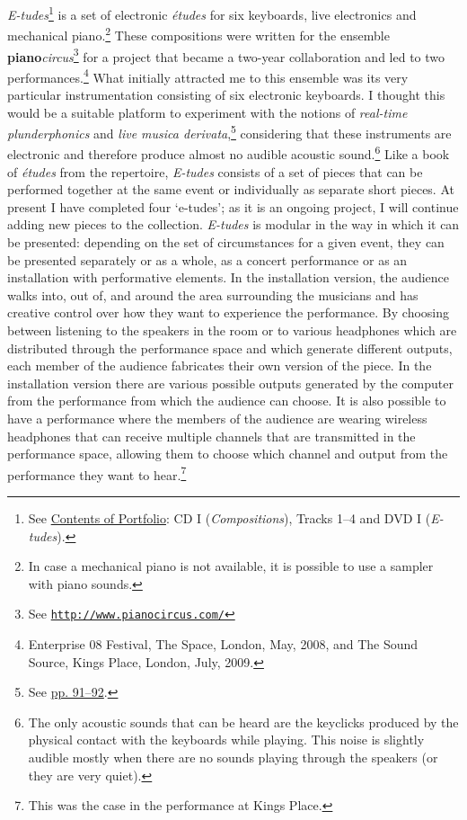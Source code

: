 \emph{E-tudes}\footnote{See \hyperlink{portfolio}{Contents of Portfolio}: CD I (\emph{Compositions}), Tracks 1--4 and DVD I (\emph{E-tudes}).} is a set of electronic \emph{\'{e}tudes} for six keyboards, live electronics and mechanical piano.\footnote{In case a mechanical piano is not available, it is possible to use a sampler with piano sounds.} These compositions were written for the ensemble \textbf{piano}\emph{circus}\footnote{See \href{http://www.pianocircus.com/}{\texttt{http://www.pianocircus.com/}}} for a project that became a \mbox{two-year} collaboration and led to two performances.\footnote{Enterprise 08 Festival, The Space, London, May, 2008, and The Sound Source, Kings Place, London, July, 2009.} What initially attracted me to this ensemble was its very particular instrumentation consisting of six electronic keyboards. I thought this would be a suitable platform to experiment with the notions of \emph{real-time plunderphonics} and \emph{live musica derivata},\footnote{See \hyperlink{realtimeplunderfuck}{pp. 91--92}.} considering that these instruments are electronic and therefore produce almost no audible acoustic sound.\footnote{The only acoustic sounds that can be heard are the keyclicks produced by the physical contact with the keyboards while playing. This noise is slightly audible mostly when there are no sounds playing through the speakers (or they are very quiet).} Like a book of \emph{\'{e}tudes} from the repertoire, \emph{E-tudes} consists of a set of pieces that can be performed together at the same event or individually as separate short pieces. At present I have completed four `e-tudes'; as it is an ongoing project, I will continue adding new pieces to the collection. \emph{E-tudes} is modular in the way in which it can be presented: depending on the set of circumstances for a given event, they can be presented separately or as a whole, as a concert performance or as an installation with performative elements. In the installation version, the audience walks into, out of, and around the area surrounding the musicians and has creative control over how they want to experience the performance. By choosing between listening to the speakers in the room or to various headphones which are distributed through the performance space and which generate different outputs, each member of the audience fabricates their own version of the piece. In the installation version there are various possible outputs generated by the computer from the performance from which the audience can choose. It is also possible to have a performance where the members of the audience are wearing wireless headphones that can receive multiple channels that are transmitted in the performance space, allowing them to choose which channel and output from the performance they want to hear.\footnote{This was the case in the performance at Kings Place.}

